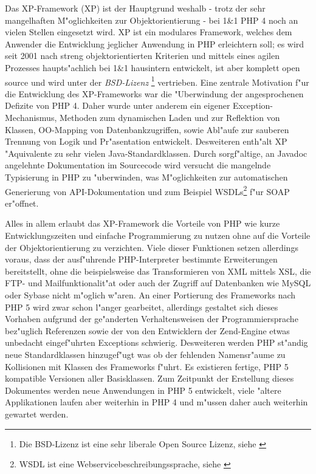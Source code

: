 Das XP-Framework \cite{XPHP} (XP) ist der Hauptgrund weshalb - trotz der sehr mangelhaften M"oglichkeiten zur 
Objektorientierung - bei 1\&1 PHP 4 noch an vielen Stellen eingesetzt wird. XP ist ein modulares Framework, welches
dem Anwender die Entwicklung jeglicher Anwendung in PHP erleichtern soll; es wird seit 2001 nach streng 
objektorientierten Kriterien und mittels eines agilen Prozesses haupts"achlich bei 1\&1 hausintern entwickelt,
ist aber komplett open source und wird unter der \emph{BSD-Lizenz}
\footnote{Die BSD-Lizenz ist eine sehr liberale Open Source Lizenz, siehe \cite{BSDLICENCE}}
vertrieben.
Eine zentrale Motivation f"ur die Entwicklung des XP-Frameworks war die "Uberwindung der angesprochenen
Defizite von PHP 4. Daher wurde unter anderem ein eigener Exception-Mechanismus, Methoden zum dynamischen
Laden und zur Reflektion von Klassen, OO-Mapping von Datenbankzugriffen, sowie Abl"aufe zur sauberen 
Trennung von Logik und Pr"asentation entwickelt. Desweiteren enth"alt XP "Aquivalente zu sehr vielen Java-Standardklassen.
Durch sorgf"altige, an Javadoc \cite{JAVADOC} angelehnte Dokumentation im Sourcecode wird versucht die mangelnde
Typisierung in PHP zu "uberwinden, was M"oglichkeiten zur automatischen Generierung von API-Dokumentation und zum
Beispiel WSDLs\footnote{
WSDL ist eine Webservicebeschreibungssprache, siehe \cite{WSDLSPEC}}
f"ur SOAP er"offnet.

Alles in allem erlaubt das XP-Framework die Vorteile von PHP wie kurze Entwicklungszeiten und einfache 
Programmierung zu nutzen ohne auf die Vorteile der Objektorientierung zu verzichten.
Viele dieser Funktionen setzen allerdings voraus, dass der ausf"uhrende PHP-Interpreter bestimmte Erweiterungen bereitstellt,
ohne die beispielsweise das Transformieren von XML mittels XSL, die FTP- und Mailfunktionalit"at oder auch
der Zugriff auf Datenbanken wie MySQL oder Sybase nicht m"oglich w"aren.
An einer Portierung des Frameworks nach PHP 5 wird zwar schon l"anger gearbeitet, allerdings gestaltet sich dieses Vorhaben
aufgrund der ge"anderten Verhaltensweisen der Programmiersprache bez"uglich Referenzen sowie der von den Entwicklern der Zend-Engine
etwas unbedacht eingef"uhrten Exceptions schwierig. Desweiteren werden PHP st"andig neue Standardklassen
hinzugef"ugt was ob der fehlenden Namensr"aume zu Kollisionen mit Klassen des Frameworks f"uhrt.
Es existieren fertige, PHP 5 kompatible Versionen aller Basisklassen. Zum Zeitpunkt der Erstellung dieses
Dokumentes werden neue Anwendungen 
in PHP 5 entwickelt, viele "altere Applikationen laufen aber weiterhin in PHP 4 und m"ussen daher auch weiterhin
gewartet werden.


